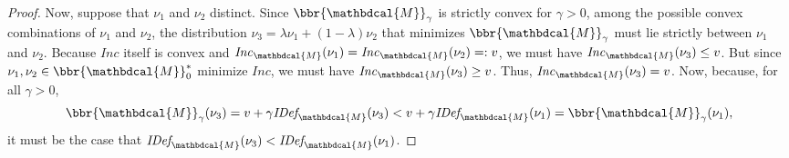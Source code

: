 \documentclass[letterpaper]{article} %
\theoremstyle{plain}
\theoremstyle{definition}
\theoremstyle{remark}
\newcommand{\dg}[1]{\mathbdcal{#1}}
\newcommand{\IDef}[1]{\mathit{IDef}_{\!#1}}
\newcommand\Inc{\mathit{Inc}}
\begin{document}
\begin{proof}
Now, suppose that $\nu_1$ and $\nu_2$ distinct. Since $\bbr{\dg M}_\gamma$
is strictly convex for $\gamma > 0$, among the possible convex
combinations of $\nu_1$ and $\nu_2$, the distribution $\nu_3 = \lambda
\nu_1 + (1-\lambda) \nu_2$ that minimizes $\bbr{\dg M}_\gamma$ must
lie strictly between $\nu_1$ and $\nu_2$. 
Because $\Inc$ itself is convex and $\Inc_{\dg M}(\nu_1) = \Inc_{\dg
  M}(\nu_2) =: v$, we must have $\Inc_{\dg M}(\nu_3) \le v$. 
But since
$\nu_1,\nu_2 \in \bbr{\dg M}_0^*$ minimize $\Inc$,
we must have $\Inc_{\dg M}(\nu_3) \ge v$.
Thus, $\Inc_{\dg M}(\nu_3) = v$. 
Now, because, for all  $\gamma > 0$,
\[ \bbr{\dg M}_\gamma(\nu_3) = v + \gamma \IDef{\dg M}(\nu_3) 
 	< v + \gamma \IDef{\dg M}(\nu_1) = \bbr{\dg M}_\gamma(\nu_1), \] 
it must be the case that $\IDef{\dg M}(\nu_3) < \IDef{\dg M}(\nu_1)$. 
        

\end{proof}
\end{document}
